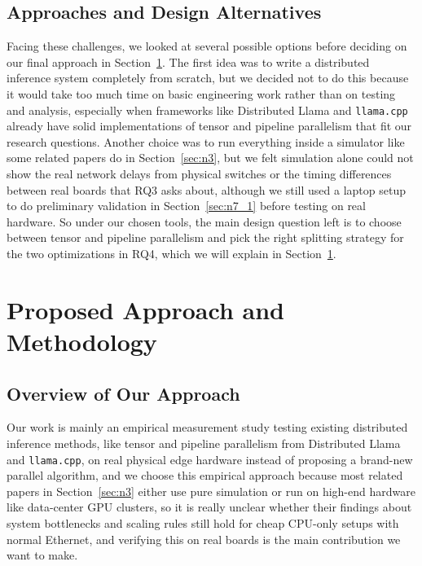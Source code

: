 \documentclass[11pt,a4paper]{article}
\begin{document}
\subsection{Approaches and Design Alternatives}\label{sec:n5_2}

Facing these challenges, we looked at several possible options before deciding on our final approach in Section~\ref{sec:n6}. The first idea was to write a distributed inference system completely from scratch, but we decided not to do this because it would take too much time on basic engineering work rather than on testing and analysis, especially when frameworks like Distributed Llama and \texttt{llama.cpp} already have solid implementations of tensor and pipeline parallelism that fit our research questions. Another choice was to run everything inside a simulator like some related papers do in Section~\ref{sec:n3}, but we felt simulation alone could not show the real network delays from physical switches or the timing differences between real boards that RQ3 asks about, although we still used a laptop setup to do preliminary validation in Section~\ref{sec:n7_1} before testing on real hardware. So under our chosen tools, the main design question left is to choose between tensor and pipeline parallelism and pick the right splitting strategy for the two optimizations in RQ4, which we will explain in Section~\ref{sec:n6}.

\section{Proposed Approach and Methodology}\label{sec:n6}

\subsection{Overview of Our Approach}\label{sec:n6_1}

Our work is mainly an empirical measurement study testing existing distributed inference methods, like tensor and pipeline parallelism from Distributed Llama and \texttt{llama.cpp}, on real physical edge hardware instead of proposing a brand-new parallel algorithm, and we choose this empirical approach because most related papers in Section~\ref{sec:n3} either use pure simulation or run on high-end hardware like data-center GPU clusters, so it is really unclear whether their findings about system bottlenecks and scaling rules still hold for cheap CPU-only setups with normal Ethernet, and verifying this on real boards is the main contribution we want to make.
\end{document}
